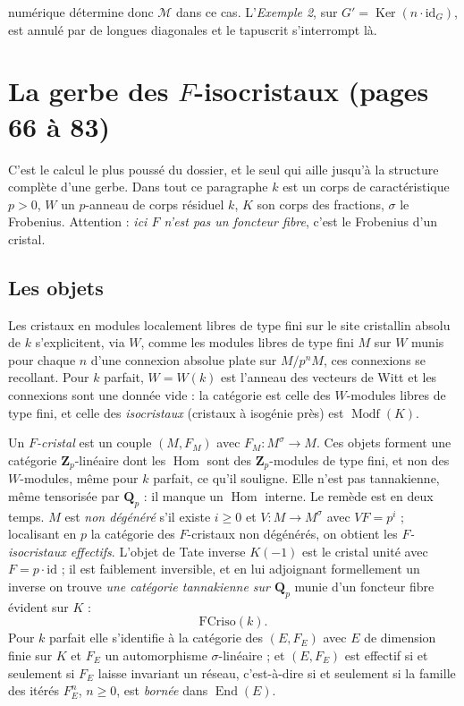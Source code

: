 \documentclass[11pt,a4paper]{article}
\begin{document}
numérique détermine donc $\mathcal{M}$ dans ce cas. L'\emph{Exemple 2},
sur $G' = \operatorname{Ker}(n \cdot \mathrm{id}_{G})$, est annulé par de
longues diagonales et le tapuscrit s'interrompt là.

\section*{La gerbe des $F$-isocristaux (pages 66 à 83)}

C'est le calcul le plus poussé du dossier, et le seul qui aille jusqu'à la
structure complète d'une gerbe. Dans tout ce paragraphe $k$ est un corps de
caractéristique $p > 0$, $W$ un $p$-anneau de corps résiduel $k$, $K$ son corps
des fractions, $\sigma$ le Frobenius. Attention : \emph{ici $F$ n'est pas un
foncteur fibre}, c'est le Frobenius d'un cristal.

\subsection*{Les objets}

Les cristaux en modules localement libres de type fini sur le site cristallin
absolu de $k$ s'explicitent, via $W$, comme les modules libres de type fini
$M$ sur $W$ munis pour chaque $n$ d'une connexion absolue plate sur
$M/p^{n}M$, ces connexions se recollant. Pour $k$ parfait, $W = W(k)$ est
l'anneau des vecteurs de Witt et les connexions sont une donnée vide : la
catégorie est celle des $W$-modules libres de type fini, et celle des
\emph{isocristaux} (cristaux à isogénie près) est $\operatorname{Modf}(K)$.

Un \emph{$F$-cristal} est un couple $(M, F_{M})$ avec $F_{M} \colon M^{\sigma}
\to M$. Ces objets forment une catégorie $\mathbf{Z}_{p}$-linéaire dont les
$\operatorname{Hom}$ sont des $\mathbf{Z}_{p}$-modules de type fini, et non
des $W$-modules, même pour $k$ parfait, ce qu'il souligne. Elle n'est pas
tannakienne, même tensorisée par $\mathbf{Q}_{p}$ : il manque un
$\operatorname{Hom}$ interne. Le remède est en deux temps. $M$ est
\emph{non dégénéré} s'il existe $i \geqslant 0$ et $V \colon M \to M^{\sigma}$
avec $VF = p^{i}$ ; localisant en $p$ la catégorie des $F$-cristaux non
dégénérés, on obtient les \emph{$F$-isocristaux effectifs}. L'objet de Tate
inverse $K(-1)$ est le cristal unité avec $F = p \cdot \mathrm{id}$ ; il est
faiblement inversible, et en lui adjoignant formellement un inverse on trouve
\emph{une catégorie tannakienne sur $\mathbf{Q}_{p}$} munie d'un foncteur fibre
évident sur $K$ :
\[
\mathrm{FCriso}(k) .
\]
Pour $k$ parfait elle s'identifie à la catégorie des $(E, F_{E})$ avec $E$ de
dimension finie sur $K$ et $F_{E}$ un automorphisme $\sigma$-linéaire ; et
$(E,F_{E})$ est effectif si et seulement si $F_{E}$ laisse invariant un réseau,
c'est-à-dire si et seulement si la famille des itérés $F_{E}^{n}$, $n
\geqslant 0$, est \emph{bornée} dans $\operatorname{End}(E)$.
\end{document}
